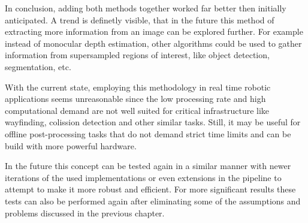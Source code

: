 In conclusion, adding both methods together worked far better then initially anticipated. A trend is definetly visible, that in the future this method of extracting more information from an image can be explored further. For example instead of monocular depth estimation, other algorithms could be used to gather information from supersampled regions of interest, like object detection, segmentation, etc.

With the current state, employing this methodology in real time robotic applications seems unreasonable since the low processing rate and high computational demand are not well suited for critical infrastructure like wayfinding, colission detection and other similar tasks. Still, it may be useful for offline post-processing tasks that do not demand strict time limits and can be build with more powerful hardware.

In the future this concept can be tested again in a similar manner with newer iterations of the used implementations or even extensions in the pipeline to attempt to make it more robust and efficient. For more significant results these tests can also be performed again after eliminating some of the assumptions and problems discussed in the previous chapter.